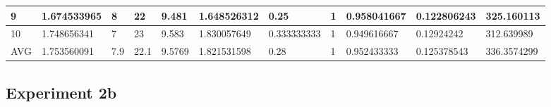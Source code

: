 \begin{table}[H]
\begin{adjustbox}{max width=380pt,keepaspectratio,angle=90}
\begin{tabular}{|l|l|l|l|l|l|l|l|l|l|l|}
						9          & 1.674533965 & 8          & 22         & 9.481      & 1.648526312 & 0.25        & 1           & 0.958041667 & 0.122806243 & 325.160113  \\ \hline
						10         & 1.748656341 & 7          & 23         & 9.583      & 1.830057649 & 0.333333333 & 1           & 0.949616667 & 0.12924242  & 312.639989  \\ \hline\hline
						AVG        & 1.753560091 & 7.9        & 22.1       & 9.5769     & 1.821531598 & 0.28        & 1           & 0.952433333 & 0.125378543 & 336.3574299 \\ \hline						
					\end{tabular}
				\end{adjustbox}	
			\end{table}
	
	\subsection{Experiment 2b}
	\label{sec:A_Exp2b}

